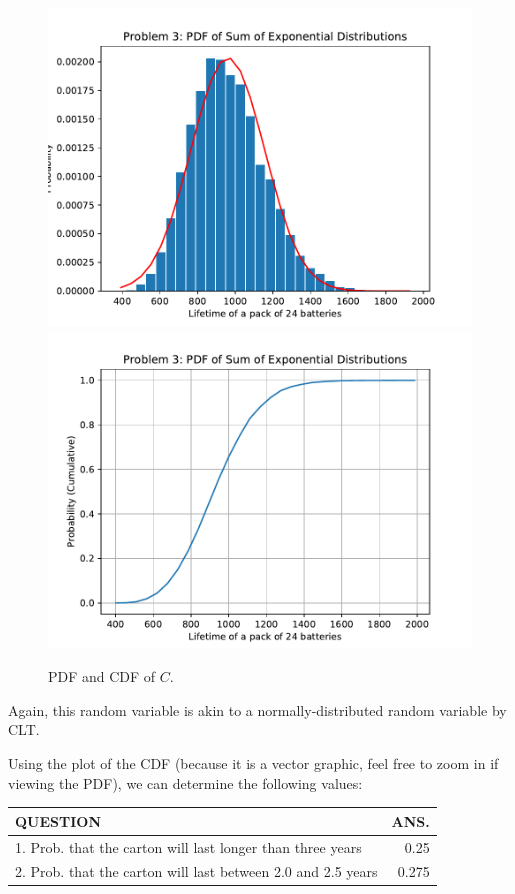 \documentclass{article}
\begin{document}
\begin{figure}[H]
    \centering
    \includegraphics[width=\textwidth]{Images/Figure8}
    \includegraphics[width=\textwidth]{Images/Figure9}
    \caption{PDF and CDF of \(C\).}
    \label{P3}
\end{figure}

Again, this random variable is akin to a normally-distributed
random variable by CLT.

Using the plot of the CDF (because it is a vector graphic,
feel free to zoom in if viewing the PDF), we can determine the
following values:

{
\begin{tabular}{|l|r|}
    \hline
    \textbf{QUESTION} & \textbf{ANS.} \\ \hline
    1. Prob. that the carton will last longer than three years & \num{0.25} \\ \hline
    2. Prob. that the carton will last between 2.0 and 2.5 years & \num{0.275} \\ \hline
\end{tabular}
}
\end{document}
